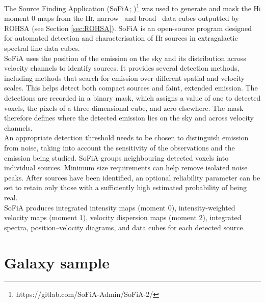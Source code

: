The Source Finding Application (SoFiA; \citealt{serra2015})\footnote{https://gitlab.com/SoFiA-Admin/SoFiA-2/} was used to generate and mask the \textrm{H\textsc{i}} moment 0 maps from the \textrm{H\textsc{i}}, narrow \HI\ and broad \HI\ data cubes outputted by ROHSA (see Section \ref{sec:ROHSA}). SoFiA is an open-source program designed for automated detection and characterisation of \textrm{H\textsc{i}} sources in extragalactic spectral line data cubes.\\\indent
SoFiA uses the position of the emission on the sky and its distribution across velocity channels to identify sources. It provides several detection methods, including methods that search for emission over different spatial and velocity scales. This helps detect both compact sources and faint, extended emission. The detections are recorded in a binary mask, which assigns a value of one to detected voxels, the pixels of a three-dimensional cube, and zero elsewhere. The mask therefore defines where the detected emission lies on the sky and across velocity channels.\\\indent
An appropriate detection threshold needs to be chosen to distinguish emission from noise, taking into account the sensitivity of the observations and the emission being studied. SoFiA groups neighbouring detected voxels into individual sources. Minimum size requirements can help remove isolated noise peaks. After sources have been identified, an optional reliability parameter can be set to retain only those with a sufficiently high estimated probability of being real.\\\indent
SoFiA produces integrated intensity maps (moment 0), intensity-weighted velocity maps (moment 1), velocity dispersion maps (moment 2), integrated spectra, position--velocity diagrams, and data cubes for each detected source.


\section{Galaxy sample}
\label{sec:galaxy_sample}

